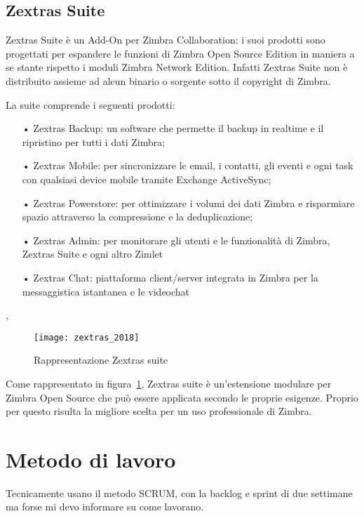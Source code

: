 \subsection{Zextras Suite}
Zextras Suite è un Add-On per Zimbra Collaboration: i suoi prodotti sono progettati per espandere le funzioni di Zimbra Open Source Edition in maniera a se stante rispetto i moduli Zimbra Network Edition. Infatti Zextras Suite non è distribuito assieme ad alcun binario o sorgente sotto il copyright di Zimbra. \\

La suite comprende i seguenti prodotti:
	\begin{itemize}
		\item[•] Zextras Backup: un software che permette il backup in realtime e il ripristino per tutti i dati Zimbra;
		\item[•] Zextras Mobile: per sincronizzare le email, i contatti, gli eventi e ogni task con qualsiasi device mobile tramite Exchange ActiveSync;
		\item[•] Zextras Powerstore: per ottimizzare i volumi dei dati Zimbra e risparmiare spazio attraverso la compressione e la deduplicazione;
		\item[•] Zextras Admin: per monitorare gli utenti e le funzionalità di Zimbra, Zextras Suite e ogni altro Zimlet
		\item[•] Zextras Chat: piattaforma client/server integrata in Zimbra per la messaggistica istantanea e le videochat
	\end{itemize},

\begin{figure}[H] 
	\centering
	\texttt{[image: zextras\_2018]}
	\caption{Rappresentazione Zextras suite}
	\label{fig:modulizextras}
\end{figure}
Come rappresentato in figura~\ref{fig:modulizextras}, Zextras suite è un'estensione modulare per Zimbra Open Source che può essere applicata secondo le proprie esigenze. Proprio per questo risulta la migliore scelta per un uso professionale di Zimbra.

\section{Metodo di lavoro}
Tecnicamente usano il metodo SCRUM, con la backlog e sprint di due settimane ma forse mi devo informare su come lavorano. \\

